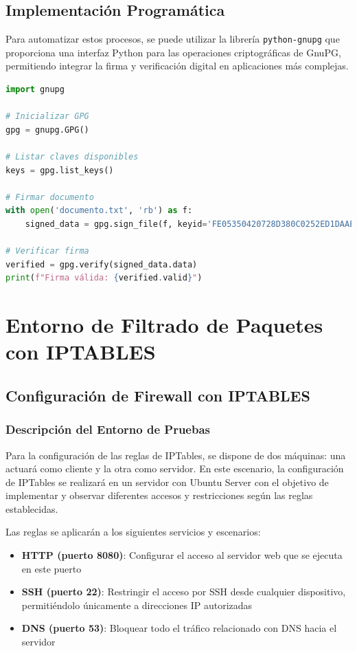 \documentclass[12pt,a4paper]{article}
\begin{document}
\subsection{Implementación Programática}

Para automatizar estos procesos, se puede utilizar la librería
\texttt{python-gnupg} que proporciona una interfaz Python para las operaciones
criptográficas de GnuPG, permitiendo integrar la firma y verificación digital
en aplicaciones más complejas.

\begin{lstlisting}[language=python, caption=Ejemplo de uso de python-gnupg]
import gnupg

# Inicializar GPG
gpg = gnupg.GPG()

# Listar claves disponibles
keys = gpg.list_keys()

# Firmar documento
with open('documento.txt', 'rb') as f:
    signed_data = gpg.sign_file(f, keyid='FE05350420728D380C0252ED1DAAE3B33B3069E6')

# Verificar firma
verified = gpg.verify(signed_data.data)
print(f"Firma válida: {verified.valid}")
\end{lstlisting}

\section{Entorno de Filtrado de Paquetes con IPTABLES}

\subsection{Configuración de Firewall con IPTABLES}

\subsubsection{Descripción del Entorno de Pruebas}

Para la configuración de las reglas de IPTables, se dispone de dos máquinas:
una actuará como cliente y la otra como servidor. En este escenario, la
configuración de IPTables se realizará en un servidor con Ubuntu Server con el
objetivo de implementar y observar diferentes accesos y restricciones según las
reglas establecidas.

Las reglas se aplicarán a los siguientes servicios y escenarios:

\begin{itemize}
  \item \textbf{HTTP (puerto 8080)}: Configurar el acceso al servidor web que se ejecuta en este puerto
  \item \textbf{SSH (puerto 22)}: Restringir el acceso por SSH desde cualquier dispositivo, permitiéndolo únicamente a direcciones IP autorizadas
  \item \textbf{DNS (puerto 53)}: Bloquear todo el tráfico relacionado con DNS hacia el servidor
\end{itemize}
\end{document}
